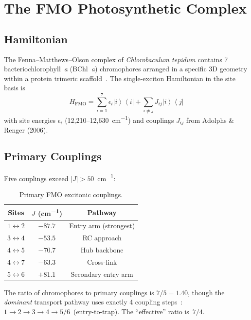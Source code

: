 \documentclass[11pt,twocolumn]{article}
\providecommand{\ket}[1]{\left|#1\right\rangle}
\providecommand{\bra}[1]{\left\langle#1\right|}
\begin{document}
\section{The FMO Photosynthetic Complex}
\label{sec:fmo}

\subsection{Hamiltonian}

The Fenna--Matthews--Olson complex of \textit{Chlorobaculum tepidum}
contains 7 bacteriochlorophyll~\textit{a} (BChl~\textit{a})
chromophores arranged in a specific 3D geometry within a protein
trimeric scaffold~\cite{Adolphs2006}.  The single-exciton Hamiltonian
in the site basis is
\begin{equation}
  H_{\mathrm{FMO}} = \sum_{i=1}^{7} \epsilon_i \ket{i}\bra{i}
  + \sum_{i \neq j} J_{ij} \ket{i}\bra{j}
\end{equation}
with site energies $\epsilon_i$ (12{,}210--12{,}630~\si{cm^{-1}})
and couplings $J_{ij}$ from Adolphs \& Renger (2006).

\subsection{Primary Couplings}

Five couplings exceed $|J| > 50$~\si{cm^{-1}}:

\begin{table}[H]
\centering
\caption{Primary FMO excitonic couplings.}
\label{tab:couplings}
\begin{tabular}{@{}ccc@{}}
\toprule
Sites & $J$ (\si{cm^{-1}}) & Pathway \\
\midrule
$1 \leftrightarrow 2$ & $-87.7$ & Entry arm (strongest) \\
$3 \leftrightarrow 4$ & $-53.5$ & RC approach \\
$4 \leftrightarrow 5$ & $-70.7$ & Hub backbone \\
$4 \leftrightarrow 7$ & $-63.3$ & Cross-link \\
$5 \leftrightarrow 6$ & $+81.1$ & Secondary entry arm \\
\bottomrule
\end{tabular}
\end{table}

The ratio of chromophores to primary couplings is $7/5 = 1.40$, though
the \emph{dominant} transport pathway uses exactly 4 coupling
steps~\cite{Chin2013}: $1 \to 2 \to 3 \to 4 \to 5/6$~(entry-to-trap).
The ``effective'' ratio is~$7/4$.
\end{document}
